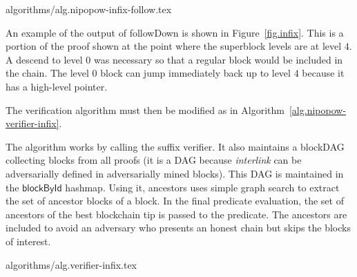 {algorithms/alg.nipopow-infix-follow.tex}

An example of the output of followDown is shown in Figure~\ref{fig.infix}. This
is a portion of the proof shown at the point where the superblock levels are at
level $4$. A descend to level $0$ was necessary so that a regular block would be
included in the chain. The level $0$ block can jump immediately back up to level
$4$ because it has a high-level pointer.

The verification algorithm must then be modified as in
Algorithm~\ref{alg.nipopow-verifier-infix}.

The algorithm works by calling the suffix verifier. It also maintains a blockDAG
collecting blocks from all proofs (it is a DAG because \textit{interlink} can be
adversarially defined in adversarially mined blocks). This DAG is maintained in
the $\textsf{blockById}$ hashmap. Using it, \textsf{ancestors} uses simple graph
search to extract the set of ancestor blocks of a block. In the final predicate
evaluation, the set of ancestors of the best blockchain tip is passed to the
predicate. The ancestors are included to avoid an adversary who presents an
honest chain but skips the blocks of interest.

{algorithms/alg.verifier-infix.tex}
